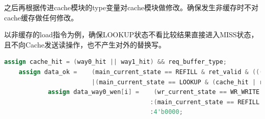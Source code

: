 \documentclass[11pt]{article}
\begin{document}
\begin{enumerate}
    之后再根据传进cache模块的type变量对cache模块做修改。确保发生非缓存时不对cache缓存做任何修改。

    以非缓存的load指令为例，确保LOOKUP状态不看比较结果直接进入MISS状态，且不向Cache发送读操作，也不产生对外的替换写。

    \begin{lstlisting}[language=verilog]
    assign cache_hit = (way0_hit || way1_hit) && req_buffer_type;
    assign data_ok =    (main_current_state == REFILL & ret_valid & (((miss_buffer_cnt == req_buffer_offset[3:2]) & req_buffer_type) | ~req_buffer_type) & ~req_buffer_op)         // read miss
                        |(main_current_state == LOOKUP & (cache_hit | req_buffer_op));             // hit or write
            assign data_way0_wen[i] =    (wr_current_state == WR_WRITE & w_buffer_way == 0 & w_buffer_bank == i)? w_buffer_wstrb
                                        :(main_current_state == REFILL & replace_way ==0 & ret_valid & miss_buffer_cnt == i & req_buffer_type) ? 4'b1111
                                        :4'b0000;
    \end{lstlisting}
    
\end{enumerate}
\end{document}
